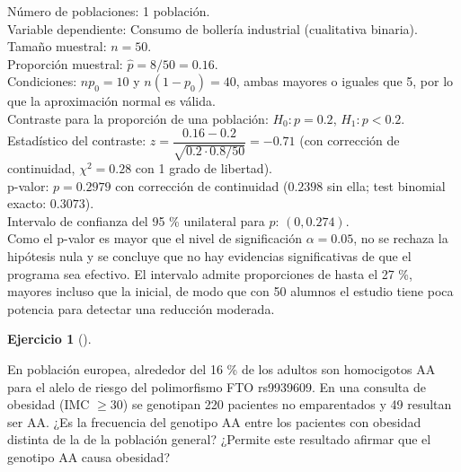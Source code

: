 \documentclass[
  spanish,
  a4paper,
]{scrreport}
\theoremstyle{definition}
\newtheorem{exercise}{Ejercicio}[chapter]
\theoremstyle{remark}
\begin{document}
\begin{tcolorbox}[enhanced jigsaw, arc=.35mm, bottomrule=.15mm, bottomtitle=1mm, breakable, colback=white, colbacktitle=quarto-callout-tip-color!10!white, colframe=quarto-callout-tip-color-frame, coltitle=black, left=2mm, leftrule=.75mm, opacityback=0, opacitybacktitle=0.6, rightrule=.15mm, title=\textcolor{quarto-callout-tip-color}{\faLightbulb}\hspace{0.5em}{Solución}, titlerule=0mm, toprule=.15mm, toptitle=1mm]

Número de poblaciones: 1 población.\\
Variable dependiente: Consumo de bollería industrial (cualitativa
binaria).\\
Tamaño muestral: \(n=50\).\\
Proporción muestral: \(\hat p=8/50=0.16\).\\
Condiciones: \(np_0=10\) y \(n(1-p_0)=40\), ambas mayores o iguales que
5, por lo que la aproximación normal es válida.\\
Contraste para la proporción de una población: \(H_0:p=0.2\),
\(H_1:p<0.2\).\\
Estadístico del contraste:
\(z=\dfrac{0.16-0.2}{\sqrt{0.2\cdot 0.8/50}}=-0.71\) (con corrección de
continuidad, \(\chi^2=0.28\) con 1 grado de libertad).\\
p-valor: \(p=0.2979\) con corrección de continuidad (\(0.2398\) sin
ella; test binomial exacto: \(0.3073\)).\\
Intervalo de confianza del 95 \% unilateral para \(p\):
\((0, 0.274)\).\\
Como el p-valor es mayor que el nivel de significación \(\alpha=0.05\),
no se rechaza la hipótesis nula y se concluye que no hay evidencias
significativas de que el programa sea efectivo. El intervalo admite
proporciones de hasta el 27 \%, mayores incluso que la inicial, de modo
que con 50 alumnos el estudio tiene poca potencia para detectar una
reducción moderada.

\end{tcolorbox}

\begin{exercise}[]\protect\hypertarget{exr-contraste-ia-proporcion-fto-obesidad}{}\label{exr-contraste-ia-proporcion-fto-obesidad}

En población europea, alrededor del 16 \% de los adultos son homocigotos
AA para el alelo de riesgo del polimorfismo FTO rs9939609. En una
consulta de obesidad (IMC \(\geq 30\)) se genotipan 220 pacientes no
emparentados y 49 resultan ser AA. ¿Es la frecuencia del genotipo AA
entre los pacientes con obesidad distinta de la de la población general?
¿Permite este resultado afirmar que el genotipo AA causa obesidad?

\end{exercise}
\end{document}
